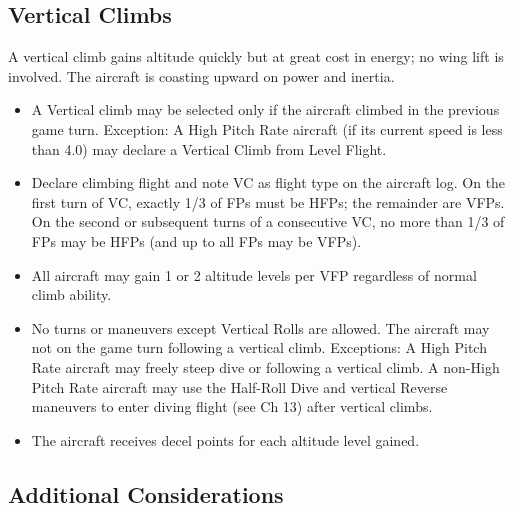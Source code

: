 \subsection{Vertical Climbs}
\label{rule:vertical-climbs}

A vertical climb gains altitude quickly but at great cost in energy; no wing lift is involved. The aircraft is coasting upward on power and inertia.

\begin{itemize}

    \item{} A Vertical climb may be selected only if the aircraft climbed in the previous game turn. Exception: A High Pitch Rate aircraft (if its current speed is less than 4.0) may declare a Vertical Climb from Level Flight.

    \item{} Declare climbing flight and note VC as flight type on the aircraft log. On the first turn of VC, exactly 1/3 of FPs must be HFPs; the remainder are VFPs. On the second or subsequent turns of a consecutive VC, no more than 1/3 of FPs may be HFPs (and up to all FPs may be VFPs).

    \item{} All aircraft may gain 1 or 2 altitude levels per VFP regardless of normal climb ability.

    \item{} No turns or maneuvers except Vertical Rolls are allowed. The aircraft may not  on the game turn following a vertical climb. Exceptions: A High Pitch Rate aircraft may freely steep dive or  following a vertical climb. A non-High Pitch Rate aircraft may use the Half-Roll Dive and vertical Reverse maneuvers to enter diving flight (see Ch 13) after vertical climbs.

    \item{} The aircraft receives  decel points for each altitude level gained.

\end{itemize}

\subsection{Additional Considerations}


